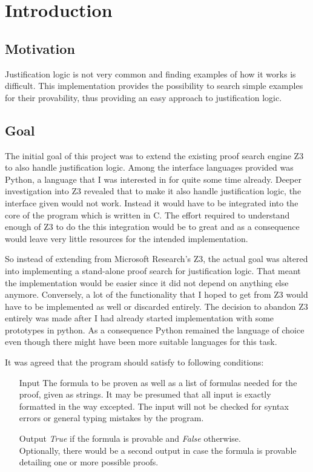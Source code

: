 \chapter{Introduction}

\section{Motivation}
Justification logic is not very common and finding examples of how it works is difficult. This implementation provides the possibility to search simple examples for their provability, thus providing an easy approach to justification logic.

\section{Goal}
The initial goal of this project was to extend the existing proof search engine Z3~\cite{z3} to also handle justification logic. Among the interface languages provided was Python, a language that I was interested in for quite some time already. Deeper investigation into Z3 revealed that to make it also handle justification logic, the interface given would not work. Instead it would have to be integrated into the core of the program which is written in C. The effort required to understand enough of Z3 to do the this integration would be to great and as a consequence would leave very little resources for the intended implementation.

So instead of extending from Microsoft Research's Z3, the actual goal was altered into implementing a stand-alone proof search for justification logic. That meant the implementation would be easier since it did not depend on anything else anymore. Conversely, a lot of the functionality that I hoped to get from Z3 would have to be implemented as well or discarded entirely. The decision to abandon Z3 entirely was made after I had already started implementation with some prototypes in python. As a consequence Python remained the language of choice even though there might have been more suitable languages for this task.

It was agreed that the program should satisfy to following conditions:

\begin{itemize}
	\item[Input] The formula to be proven as well as a list of formulas needed for the proof, given as strings. It may be presumed that all input is exactly formatted in the way excepted. The input will not be checked for syntax errors or general typing mistakes by the program.
	\item[Output] \emph{True} if the formula is provable and \emph{False} otherwise. \\Optionally, there would be a second output in case the formula is provable detailing one or more possible proofs.
\end{itemize}

